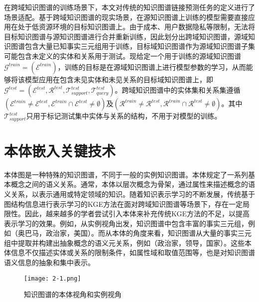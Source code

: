 在跨域知识图谱的训练场景下，本文对传统的知识图谱链接预测任务的定义进行了场景适配。基于跨域知识图谱的现实场景，在源知识图谱上训练的模型需要直接应用在处于低资源环境的目标知识图谱上。由于成本、用户数据隐私等限制，无法将目标知识图谱与源知识图谱进行合并重新训练，因此划分出跨域知识图谱，源域知识图谱包含大量已知事实三元组用于训练，目标域知识图谱作为源域知识图谱子集可能包含未定义的实体和关系用于测试。现给定一个用于训练的源域知识图谱\(\mathcal{G}^{train} = (\mathcal{E}^{train})\)，训练的目标是在源域知识图谱上进行模型参数的学习，从而能够将该模型应用在包含未见实体和未见关系的目标域知识图谱上，即\(\mathcal{G}^{test} = (\mathcal{E}^{test},\mathcal{R}^{test},\mathcal{T}^{test}_{support},\mathcal{T}^{test}_{query})\)。跨域知识图谱中的实体集和关系集遵循\((\mathcal{E}^{train} \neq \mathcal{E}^{test},\mathcal{E}^{train} \cap \mathcal{E}^{test} \neq \emptyset)\)及\((\mathcal{R}^{train} \neq \mathcal{R}^{test},\mathcal{R}^{train} \cap \mathcal{R}^{test} \neq \emptyset)\)。其中\(\mathcal{T}^{test}_{support}\)只用于标记测试集中实体与关系的结构，不用于对模型的训练。

\section{本体嵌入关键技术}
本体图是一种特殊的知识图谱，不同于一般的实例知识图谱。本体规定了一系列基本概念之间的语义关系。通常，本体以层次概念为骨架，通过属性来描述概念的语义关系，以表示通用或特定领域的知识。随着知识表示学习的不断发展，传统基于图结构信息进行表示学习的KGE方法在面对跨域知识图谱等场景下，存在一定局限性。因此，越来越多的学者尝试引入本体来补充传统KGE方法的不足，以提高表示学习的效果。例如，从实例视角出发，知识图谱中包含丰富的事实三元组，例如（奥巴马，政治家，美国）。而从本体的角度来看，知识图谱从大量的事实三元组中提取并构建出抽象概念的语义元关系，例如（政治家，领导，国家）。这些本体信息不仅描述实体或关系的限制条件，如属性域和取值范围等，也是对知识图谱语义信息的抽象和集中表示。
\begin{figure}[h]
  \centering
  \texttt{[image: 2-1.png]}
  \caption{知识图谱的本体视角和实例视角}
  \label{fig:2-1}
\end{figure}

